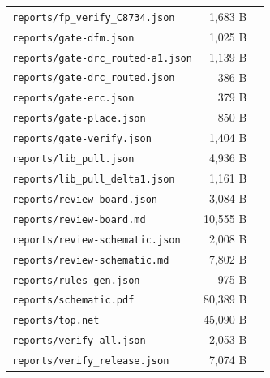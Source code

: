 \documentclass[11pt,a4paper]{article}
\begin{document}
{\begin{longtable}{p{9cm}rp{4cm}}
\texttt{reports/fp\_verify\_C8734.json} & 1,683 B &  \\
\texttt{reports/gate-dfm.json} & 1,025 B &  \\
\texttt{reports/gate-drc\_routed-a1.json} & 1,139 B &  \\
\texttt{reports/gate-drc\_routed.json} & 386 B &  \\
\texttt{reports/gate-erc.json} & 379 B &  \\
\texttt{reports/gate-place.json} & 850 B &  \\
\texttt{reports/gate-verify.json} & 1,404 B &  \\
\texttt{reports/lib\_pull.json} & 4,936 B &  \\
\texttt{reports/lib\_pull\_delta1.json} & 1,161 B &  \\
\texttt{reports/review-board.json} & 3,084 B &  \\
\texttt{reports/review-board.md} & 10,555 B &  \\
\texttt{reports/review-schematic.json} & 2,008 B &  \\
\texttt{reports/review-schematic.md} & 7,802 B &  \\
\texttt{reports/rules\_gen.json} & 975 B &  \\
\texttt{reports/schematic.pdf} & 80,389 B &  \\
\texttt{reports/top.net} & 45,090 B &  \\
\texttt{reports/verify\_all.json} & 2,053 B &  \\
\texttt{reports/verify\_release.json} & 7,074 B &  \\
\bottomrule
\end{longtable}
}
\end{document}
